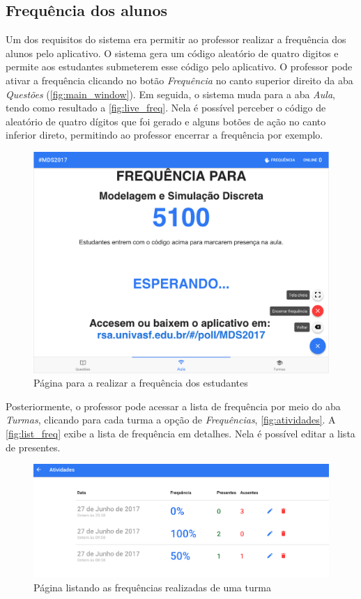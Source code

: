 \subsection{Frequência dos alunos}
\label{sec:freq_students}

Um dos requisitos do sistema era permitir ao professor realizar a frequência dos alunos
pelo aplicativo. O sistema gera um código aleatório de quatro digitos e permite aos estudantes
submeterem esse código pelo aplicativo. O professor pode ativar a frequência
clicando no botão \textit{Frequência} no canto superior direito da aba \textit{Questões} (\autoref{fig:main_window}).
Em seguida, o sistema muda para a aba \textit{Aula}, tendo como resultado a \autoref{fig:live_freq}.
Nela é possível perceber o código de aleatório de quatro dígitos que foi gerado e alguns botões de ação no canto
inferior direto, permitindo ao professor encerrar a frequência por exemplo.

\begin{figure}[ht]
  \centering
  \caption{Página para a realizar a frequência dos estudantes}
  \label{fig:live_freq}
  \includegraphics[scale=.30]{imagens/telas/live_freq}
  \doautor
\end{figure}

Posteriormente, o professor pode acessar a lista de frequência por meio do aba \textit{Turmas},
clicando para cada turma a opção de \textit{Frequências}, \autoref{fig:atividades}. A \autoref{fig:list_freq} exibe a
lista de frequência em detalhes. Nela é possível editar a lista de presentes.

\begin{figure}[ht]
  \centering
  \caption{Página listando as frequências realizadas de uma turma}
  \label{fig:atividades}
  \includegraphics[scale=.35]{imagens/telas/atividades}
  \doautor
\end{figure}

